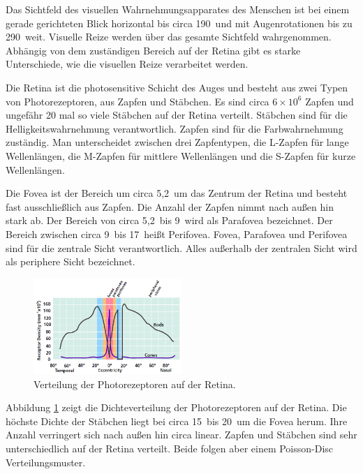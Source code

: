 Das Sichtfeld des visuellen Wahrnehmungsapparates des Menschen ist bei einem gerade gerichteten Blick horizontal bis circa 190\,\textdegree{} und mit Augenrotationen bis zu 290\,\textdegree{} weit.
Visuelle Reize werden über das gesamte Sichtfeld wahrgenommen.
Abhängig von dem zuständigen Bereich auf der Retina gibt es starke Unterschiede, wie die visuellen Reize verarbeitet werden.

Die Retina ist die photosensitive Schicht des Auges und besteht aus zwei Typen von Photorezeptoren, aus Zapfen und Stäbchen.
Es sind circa $6\times10^6$ Zapfen und ungefähr 20 mal so viele Stäbchen auf der Retina verteilt.
Stäbchen sind für die Helligkeitswahrnehmung verantwortlich.
Zapfen sind für die Farbwahrnehmung zuständig.
Man unterscheidet zwischen drei Zapfentypen, die L-Zapfen für lange Wellenlängen, die M-Zapfen für mittlere Wellenlängen und die S-Zapfen für kurze Wellenlängen.

Die Fovea ist der Bereich um circa 5,2\,\textdegree{} um das Zentrum der Retina und besteht fast ausschließlich aus Zapfen.
Die Anzahl der Zapfen nimmt nach außen hin stark ab.
Der Bereich von circa 5,2\,\textdegree{} bis 9\,\textdegree{} wird als Parafovea bezeichnet.
Der Bereich zwischen circa 9\,\textdegree{} bis 17\,\textdegree{} heißt Perifovea.
Fovea, Parafovea und Perifovea sind für die zentrale Sicht verantwortlich.
Alles außerhalb der zentralen Sicht wird als periphere Sicht bezeichnet.
\begin{figure}
	\centering
	\includegraphics[width=0.5\textwidth]{../../Grafiken/Retinal-photoreceptor-distr_from-star-report.PNG}
	\caption{Verteilung der Photorezeptoren auf der Retina. \cite{doi:10.1111/cfg.13150}}
	\label{fig::eye02}
\end{figure}
Abbildung \ref{fig::eye02} zeigt die Dichteverteilung der Photorezeptoren auf der Retina.
Die höchste Dichte der Stäbchen liegt bei circa 15\,\textdegree{} bis 20\,\textdegree{} um die Fovea herum.
Ihre Anzahl verringert sich nach außen hin circa linear.
Zapfen und Stäbchen sind sehr unterschiedlich auf der Retina verteilt.
Beide folgen aber einem Poisson-Disc Verteilungsmuster.

